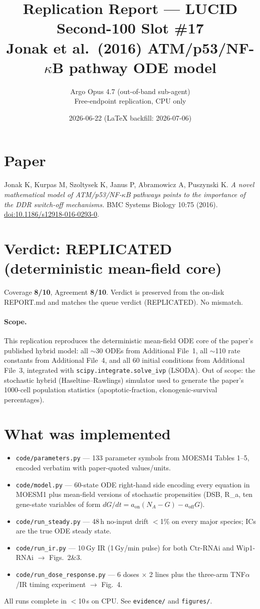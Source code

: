 \documentclass[11pt]{article}
\title{Replication Report --- LUCID Second-100 Slot \#17\\
\large Jonak et al.\ (2016) ATM/p53/NF-$\kappa$B pathway ODE model}
\author{Argo Opus 4.7 (out-of-band sub-agent) \\ Free-endpoint replication, CPU only}
\date{2026-06-22 (LaTeX backfill: 2026-07-06)}
\begin{document}
\maketitle

\section*{Paper}
Jonak K, Kurpas M, Szoltysek K, Janus P, Abramowicz A, Puszynski K.
\emph{A novel mathematical model of ATM/p53/NF-$\kappa$B pathways points to the
importance of the DDR switch-off mechanisms.} BMC Systems Biology 10:75 (2016).
\href{https://doi.org/10.1186/s12918-016-0293-0}{doi:10.1186/s12918-016-0293-0}.

\section*{Verdict: REPLICATED (deterministic mean-field core)}
Coverage \textbf{8/10}, Agreement \textbf{8/10}. Verdict is preserved from the
on-disk REPORT.md and matches the queue verdict (REPLICATED). No mismatch.

\paragraph{Scope.} This replication reproduces the deterministic mean-field ODE
core of the paper's published hybrid model: all $\sim$30 ODEs from Additional
File~1, all $\sim$110 rate constants from Additional File~4, and all 60 initial
conditions from Additional File~3, integrated with \texttt{scipy.integrate.solve\_ivp}
(LSODA). Out of scope: the stochastic hybrid (Haseltine--Rawlings) simulator
used to generate the paper's 1000-cell population statistics
(apoptotic-fraction, clonogenic-survival percentages).

\section{What was implemented}
\begin{itemize}
  \item \texttt{code/parameters.py} --- 133 parameter symbols from MOESM4
        Tables 1--5, encoded verbatim with paper-quoted values/units.
  \item \texttt{code/model.py} --- 60-state ODE right-hand side encoding every
        equation in MOESM1 plus mean-field versions of stochastic propensities
        (DSB, R\_a, ten gene-state variables of form
        $dG/dt = a_{\mathrm{on}}(N_A - G) - a_{\mathrm{off}} G$).
  \item \texttt{code/run\_steady.py} --- 48\,h no-input drift $<$1\% on every
        major species; ICs are the true ODE steady state.
  \item \texttt{code/run\_ir.py} --- 10\,Gy IR (1\,Gy/min pulse) for both
        Ctr-RNAi and Wip1-RNAi $\rightarrow$ Figs.~2\&3.
  \item \texttt{code/run\_dose\_response.py} --- 6 doses $\times$ 2 lines plus
        the three-arm TNF$\alpha$/IR timing experiment $\rightarrow$ Fig.~4.
\end{itemize}
All runs complete in $<$10\,s on CPU. See \texttt{evidence/} and \texttt{figures/}.
\end{document}
